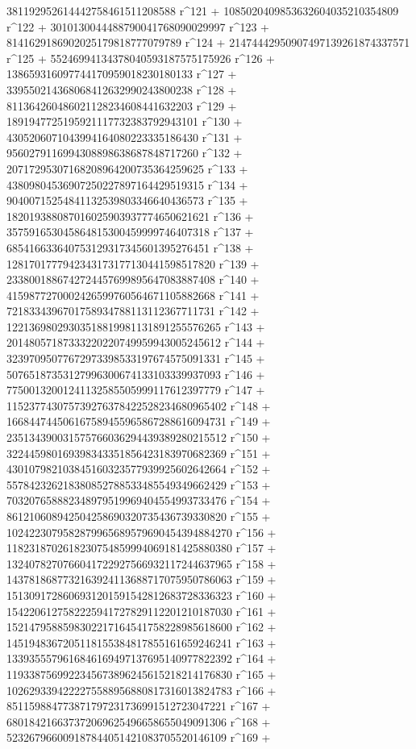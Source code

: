        381192952614442758461511208588 r^121 + 
       1085020409853632604035210354809 r^122 + 
       3010130044488790041768090029997 r^123 + 
       8141629186902025179818777079789 r^124 + 
       21474442950907497139261874337571 r^125 + 
       55246994134378040593187575175926 r^126 + 
       138659316097744170959018230180133 r^127 + 
       339550214368068412632990243800238 r^128 + 
       811364260486021128234608441632203 r^129 + 
       1891947725195921117732383792943101 r^130 + 
       4305206071043994164080223335186430 r^131 + 
       9560279116994308898638687848717260 r^132 + 
       20717295307168208964200735364259625 r^133 + 
       43809804536907250227897164429519315 r^134 + 
       90400715254841132539803346640436573 r^135 + 
       182019388087016025903937774650621621 r^136 + 
       357591653045864815300459999746407318 r^137 + 
       685416633640753129317345601395276451 r^138 + 
       1281701777942343173177130441598517820 r^139 + 
       2338001886742724457699895647083887408 r^140 + 
       4159877270002426599760564671105882668 r^141 + 
       7218334396701758934788113112367711731 r^142 + 
       12213698029303518819981131891255576265 r^143 + 
       20148057187333220220749959943005245612 r^144 + 
       32397095077672973398533197674575091331 r^145 + 
       50765187353127996300674133103339937093 r^146 + 
       77500132001241132585505999117612397779 r^147 + 
       115237743075739276378422528234680965402 r^148 + 
       166844744506167589455965867288616094731 r^149 + 
       235134390031575766036294439389280215512 r^150 + 
       322445980169398343351856423183970682369 r^151 + 
       430107982103845160323577939925602642664 r^152 + 
       557842326218380852788533485549349662429 r^153 + 
       703207658882348979519969404554993733476 r^154 + 
       861210608942504258690320735436739330820 r^155 + 
       1024223079582879965689579690454394884270 r^156 + 
       1182318702618230754859994069181425880380 r^157 + 
       1324078270766041722927566932117244637965 r^158 + 
       1437818687732163924113688717075950786063 r^159 + 
       1513091728606931201591542812683728336323 r^160 + 
       1542206127582225941727829112201210187030 r^161 + 
       1521479588598302217164541758228985618600 r^162 + 
       1451948367205118155384817855161659246241 r^163 + 
       1339355579616846169497137695140977822392 r^164 + 
       1193387569922345673896245615218214176830 r^165 + 
       1026293394222275588956880817316013824783 r^166 + 
       851159884773871797231736991512723047221 r^167 + 
       680184216637372069625496658655049091306 r^168 + 
       523267966009187844051421083705520146109 r^169 + 
